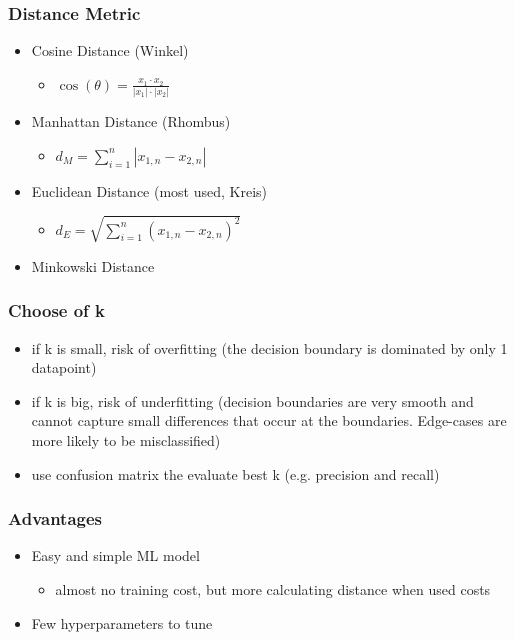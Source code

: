 \subsubsection{Distance Metric}
\begin{itemize}
    \item Cosine Distance (Winkel)
    \begin{itemize}
        \item $\cos(\theta)=\frac{x_1 \cdot x_2}{|x_1| \cdot |x_2|}$
    \end{itemize}
    \item Manhattan Distance (Rhombus)
    \begin{itemize}
        \item $d_M=\displaystyle\sum_{i=1}^n | x_{1,n}-x_{2,n}|$
    \end{itemize}
    \item Euclidean Distance (most used, Kreis)
    \begin{itemize}
        \item $d_E=\sqrt{\displaystyle\sum_{i=1}^n(x_{1,n}-x_{2,n})^2}$
    \end{itemize}
    \item Minkowski Distance
\end{itemize}

\subsubsection{Choose of k}
\begin{itemize}
    \item if k is small, risk of overfitting (the decision boundary is dominated by only 1 datapoint)
    \item if k is big, risk of underfitting (decision boundaries are very smooth and cannot capture small differences that occur at the boundaries. Edge-cases are more likely to be misclassified)
    \item use confusion matrix the evaluate best k (e.g. precision and recall)
\end{itemize}

\subsubsection{Advantages}
\begin{itemize}
    \item Easy and simple ML model
    \begin{itemize}
        \item almost no training cost, but more calculating distance when used costs
    \end{itemize}
    \item Few hyperparameters to tune
\end{itemize}

